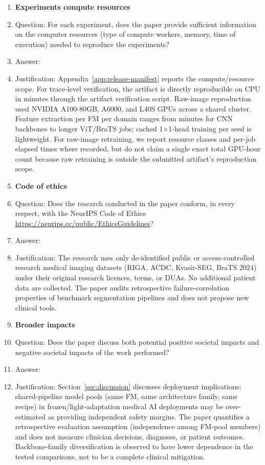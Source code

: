 \begin{enumerate}[leftmargin=*,itemsep=2pt,parsep=0pt,topsep=2pt]
\item {\bf Experiments compute resources}
    \item[] Question: For each experiment, does the paper provide sufficient information on the computer resources (type of compute workers, memory, time of execution) needed to reproduce the experiments?
    \item[] Answer: \answerYes{}
\item[] Justification: Appendix~\ref{app:release-manifest} reports the compute/resource scope. For trace-level verification, the artifact is directly reproducible on CPU in minutes through the artifact verification script. Raw-image reproduction used NVIDIA A100-80GB, A6000, and L40S GPUs across a shared cluster. Feature extraction per FM per domain ranges from minutes for CNN backbones to longer ViT/BraTS jobs; cached 1$\times$1-head training per seed is lightweight. For raw-image retraining, we report resource classes and per-job elapsed times where recorded, but do not claim a single exact total GPU-hour count because raw retraining is outside the submitted artifact's reproduction scope.

\item {\bf Code of ethics}
    \item[] Question: Does the research conducted in the paper conform, in every respect, with the NeurIPS Code of Ethics \url{https://neurips.cc/public/EthicsGuidelines}?
    \item[] Answer: \answerYes{}
    \item[] Justification: The research uses only de-identified public or access-controlled research medical imaging datasets (RIGA, ACDC, Kvasir-SEG, BraTS 2024) under their original research licences, terms, or DUAs. No additional patient data are collected. The paper audits retrospective failure-correlation properties of benchmark segmentation pipelines and does not propose new clinical tools.

\item {\bf Broader impacts}
    \item[] Question: Does the paper discuss both potential positive societal impacts and negative societal impacts of the work performed?
    \item[] Answer: \answerYes{}
    \item[] Justification: Section~\ref{sec:discussion} discusses deployment implications: shared-pipeline model pools (same FM, same architecture family, same recipe) in frozen/light-adaptation medical AI deployments may be over-estimated as providing independent safety margins. The paper quantifies a retrospective evaluation assumption (independence among FM-pool members) and does not measure clinician decisions, diagnoses, or patient outcomes. Backbone-family diversification is observed to have lower dependence in the tested comparisons, not to be a complete clinical mitigation.


\end{enumerate}
